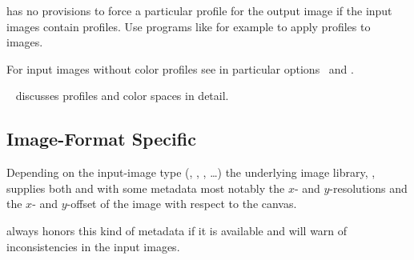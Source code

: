 \App{} has no provisions to force a particular  profile
for the output image if the input images contain profiles.  Use
programs like for example
 to apply profiles to
 images.

For input images without color profiles see in particular
options~ and
.

\chapterName~ discusses 
profiles and color spaces in detail.


\subsection[Format Specific]{\label{sec:metadata-specific}%
  Image-Format Specific}

%
%
%
%
%
%
Depending on the input-image type (, ,
, \dots) the underlying image library,
, supplies both \App{} and
\OtherApp{} with some metadata most notably the $x$- and
$y$-resolutions and the $x$- and $y$-offset of the image with respect
to the canvas.

\App{} always honors this kind of metadata if it is available and will
warn of inconsistencies in the input images.


